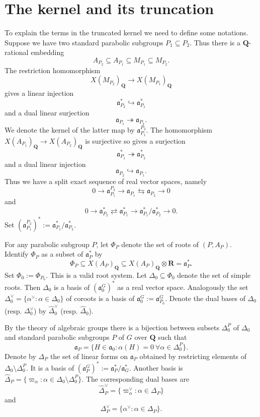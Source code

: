 \documentclass[11pt]{amsart}
\def\Q{\mathbf Q}
\def\R{\mathbf R}
\def\aaa{\mathfrak a}
\def\bs{\setminus}
\def\se{\subseteq}
\theoremstyle{remark}
\begin{document}
\section{The kernel and its truncation}

To explain the terms in the truncated kernel we need to define some notations. Suppose we have two standard parabolic subgroups $P_1 \se P_2$. Thus there is a $\Q$-rational embedding
\[ A_{P_2} \se A_{P_1} \se M_{P_1} \se M_{P_2}. \]
The restriction homomorphism 
\[ X(M_{P_2})_{\Q} \to X(M_{P_1})_{\Q} \]
gives a linear injection
\[ \aaa_{P_2}^* \hookrightarrow \aaa_{P_1}^* \]
and a dual linear surjection
\[ \aaa_{P_1} \twoheadrightarrow \aaa_{P_2}. \]
We denote the kernel of the latter map by $\aaa_{P_1}^{P_2}$. The homomorphism $X(A_{P_1})_{\Q} \to X(A_{P_2})_{\Q}$ is surjective so gives a surjection
\[ \aaa_{P_1}^* \twoheadrightarrow \aaa_{P_2}^* \]
and a dual linear injection
\[ \aaa_{P_2} \hookrightarrow \aaa_{P_1}. \]
Thus we have a split exact sequence of real vector spaces, namely
\[ 0 \to \aaa_{P_1}^{P_2} \to \aaa_{P_1} \leftrightarrows \aaa_{P_2} \to 0\]
and 
\[ 0 \to \aaa_{P_2}^* \rightleftarrows \aaa_{P_1}^* \to \aaa_{P_1}^* / \aaa_{P_2}^* \to 0. \]
Set $(\aaa_{P_1}^{P_2})^* := \aaa_{P_1}^* / \aaa_{P_2}^*$. 

For any parabolic subgroup $P$, let $\Phi_P$ denote the set of roots of $(P, A_P)$. Identify $\Phi_P$ as a subset of $\aaa_P^*$ by 
\[ \Phi_P \se X(A_P)_\Q \se X(A_P)_\Q \otimes \R = \aaa_P^*. \]
Set $\Phi_0 := \Phi_{P_0}$. This is a valid root system. Let $\Delta_0 \se \Phi_0$ denote the set of simple roots. Then $\Delta_0$ is a basis of $(\aaa_0^G)^*$ as a real vector space. Analogously the set $\Delta_0^\vee = \{ \alpha^\vee : \alpha \in \Delta_0\}$ of coroots is a basis of $\aaa_0^G:= \aaa_{P_0}^G$. Denote the dual bases of $\Delta_0$ (resp. $\Delta_0^\vee$) by $\hat\Delta_0^\vee$ (resp. $\hat\Delta_0$). 

By the theory of algebraic groups there is a bijection between subsets $\Delta_0^P$ of $\Delta_0$ and standard parabolic subgroups $P$ of $G$ over $\Q$ such that 
\[ \aaa_P = \{ H \in \aaa_0 : \alpha(H) = 0 \ \forall \alpha \in \Delta_0^P \}. \]
Denote by $\Delta_P$ the set of linear forms on $\aaa_P$ obtained by restricting elements of $\Delta_0 \bs \Delta_0^P$. It is a basis of $(\aaa_P^G)^* := \aaa_P^* / \aaa_G^*$. Another basis is $\hat\Delta_P = \{ \varpi_\alpha : \alpha \in \Delta_0 \bs \Delta_0^P \}.$ The corresponding dual bases are 
\[ \hat\Delta_P^\vee = \{\varpi_\alpha^\vee : \alpha \in \Delta_P \} \]
and
\[ \Delta_P^\vee = \{ \alpha^\vee : \alpha \in \Delta_P \}. \]
\end{document}
